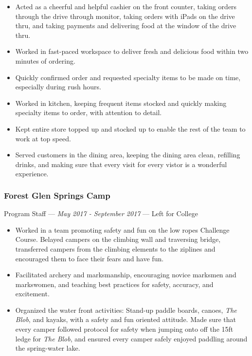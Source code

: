 \documentclass[letterpaper,10pt]{article}
\begin{document}
\begin{itemize}
\tightlist{}
\item
	Acted as a cheerful and helpful cashier on the front counter, taking orders through the drive through monitor, taking orders with iPads on the drive thru, and taking payments and delivering food at the window of the drive thru.
\item
	Worked in fast-paced workspace to deliver fresh and delicious food within two minutes of ordering.
\item
	Quickly confirmed order and requested specialty items to be made on time, especially during rush hours.
\item
	Worked in kitchen, keeping frequent items stocked and quickly making specialty items to order, with attention to detail.
\item
	Kept entire store topped up and stocked up to enable the rest of the team to work at top speed.
\item
	Served customers in the dining area, keeping the dining area clean, refilling drinks, and making sure that every visit for every vistor is a wonderful experience.\end{itemize}

\subsubsection{Forest Glen Springs Camp}
\hfill Program Staff --- \emph{May 2017 - September 2017} --- Left for College

\begin{itemize}
\tightlist{}
\item
	Worked in a team promoting safety and fun on the low ropes Challenge Course. Belayed campers on the climbing wall and traversing bridge, transferred campers from the climbing elements to the ziplines and encouraged them to face their fears and have fun.
\item
	Facilitated archery and marksmanship, encouraging novice marksmen and markswomen, and teaching best practices for safety, accuracy, and excitement.
\item
	Organized the water front activities: Stand-up paddle boards, canoes, \emph{The Blob}, and kayaks, with a safety and fun oriented attitude. Made sure that every camper followed protocol for safety when jumping onto off the 15ft ledge for \emph{The Blob}, and ensured every camper safely enjoyed paddling around the spring-water lake.
\end{itemize}
\end{document}
